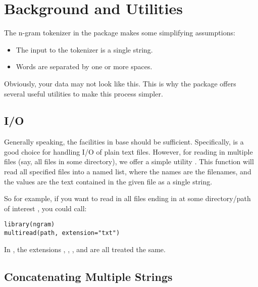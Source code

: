 \section{Background and Utilities}\label{utils}


The n-gram tokenizer in the  package makes some simplifying assumptions:
\begin{itemize}
  \item The input to the tokenizer is a single string.
  \item Words are separated by one or more spaces.
\end{itemize}
Obviously, your data may not look like this.  This is why the  package offers several useful utilities to make this process simpler.  


\subsection{I/O}

Generally speaking, the facilities in base  should be sufficient.  Specifically,  is a good choice for handling I/O of plain text files.  However, for reading in multiple files (say, all  files in some directory), we offer a simple utility .  This function will read all specified files into a named list, where the names are the filenames, and the values are the text contained in the given file as a single string.  

So for example, if you want to read in all files ending in  at some directory/path of interest , you could call:
\begin{lstlisting}[language=rr]
library(ngram)
multiread(path, extension="txt")
\end{lstlisting}
In , the extensions , , , and  are all treated the same.



\subsection{Concatenating Multiple Strings}

